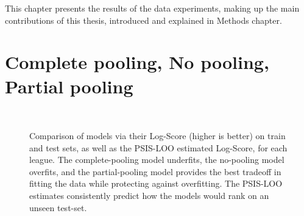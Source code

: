 This chapter presents the results of the data experiments, making up the main contributions of this thesis, introduced and explained in Methods chapter.

\section{Complete pooling, No pooling, Partial pooling}

\begin{figure}
	 \\
	\caption{Comparison of models via their Log-Score (higher is better) on train and test sets, as well as the PSIS-LOO estimated Log-Score, for each league. The complete-pooling model underfits, the no-pooling model overfits, and the partial-pooling model provides the best tradeoff in fitting the data while protecting against overfitting. The PSIS-LOO estimates consistently predict how the models would rank on an unseen test-set.}
	\label{fig:log_scores}
\end{figure}

